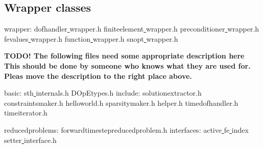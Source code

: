 \subsection{Wrapper classes}

wrapper:
dofhandler\underline{ }wrapper.h  finiteelement\underline{ }wrapper.h  preconditioner\underline{ }wrapper.h
fevalues\underline{ }wrapper.h    function\underline{ }wrapper.h       snopt\underline{ }wrapper.h

{\bf TODO! The following files need some appropriate description here 
This should be done by someone who knows what they are used for. Pleas move the description to the right place above.}

basic:
      sth\underline{ }internals.h                     
      DOpEtypes.h 
include:   
solutionextractor.h                 
constraintsmaker.h            helloworld.h                     sparsitymaker.h                     
            helper.h                                           timedofhandler.h                    
              timeiterator.h                        

reducedproblems:
 forwardtimestepreducedproblem.h
interfaces:
active\underline{ }fe\underline{ }index\underline{ }setter\underline{ }interface.h  


